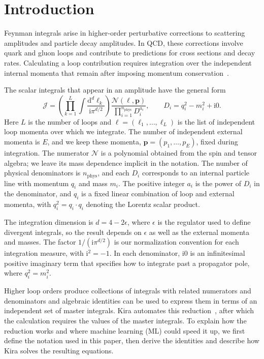 \section{Introduction}
\label{sec:introduction}
Feynman integrals arise in higher-order perturbative corrections to
scattering amplitudes and particle decay amplitudes. In QCD, these
corrections involve quark and gluon loops and contribute to predictions
for cross sections and decay rates. Calculating a loop contribution
requires integration over the independent internal momenta that remain
after imposing momentum conservation~\cite{Weinzierl2010}.

The scalar integrals that appear in an amplitude have the general form
\begin{equation}
 \mathcal J=
 \left(\prod_{k=1}^{L}\int
       \frac{\mathrm{d}^{d}\ell_k}{\mathrm{i}\pi^{d/2}}\right)
 \frac{\mathcal N(\boldsymbol\ell,\boldsymbol p)}
      {\prod_{i=1}^{n_{\mathrm{phys}}}D_i^{a_i}},
 \qquad D_i=q_i^2-m_i^2+\mathrm{i}0.
 \label{eq:general-integral}
\end{equation}
Here $L$ is the number of loops and
$\boldsymbol\ell=(\ell_1,\ldots,\ell_L)$ is the list of independent loop
momenta over which we integrate. The number of independent external
momenta is $E$, and we keep these momenta,
$\boldsymbol p=(p_1,\ldots,p_E)$, fixed during integration. The numerator
$\mathcal N$ is a polynomial obtained from the spin and tensor algebra;
we leave its mass dependence implicit in the notation.
The number of physical denominators is $n_{\mathrm{phys}}$, and each
$D_i$ corresponds to an internal particle line with momentum $q_i$ and
mass $m_i$. The positive integer $a_i$ is the power of $D_i$ in the
denominator, and $q_i$ is a fixed linear combination of loop and external
momenta, with $q_i^2=q_i\cdot q_i$ denoting the Lorentz scalar product.

The integration dimension is $d=4-2\epsilon$, where $\epsilon$ is the
regulator used to define divergent integrals, so the result depends on
$\epsilon$ as well as the external momenta and masses. The factor
$1/(\mathrm{i}\pi^{d/2})$ is our normalization convention for each
integration measure, with $\mathrm{i}^2=-1$. In each denominator,
$\mathrm{i}0$ is an infinitesimal positive imaginary term that specifies
how to integrate past a propagator pole, where $q_i^2=m_i^2$.

Higher loop orders produce collections of integrals with related numerators
and denominators and algebraic identities can be used to express them in
terms of an independent set of master integrals. Kira automates this
reduction~\cite{KiraOriginal}, after which the calculation requires the
values of the master integrals.
To explain how the reduction works and where machine learning (ML) could
speed it up, we first define the notation used in this paper, then derive
the identities and describe how Kira solves the resulting equations.

